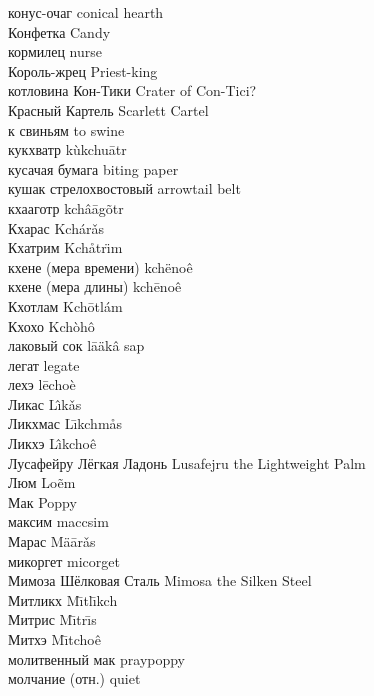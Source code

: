 конус-очаг \hfill conical hearth\\
Конфетка \hfill Candy\\
кормилец \hfill nurse\\
Король-жрец \hfill Priest-king\\
котловина Кон-Тики \hfill Crater of Con-Tici?\\
Красный Картель \hfill Scarlett Cartel\\
к свиньям \hfill to swine\\
кукхватр \hfill k\`{u}kchu\={a}tr\\
кусачая бумага \hfill biting paper\\
кушак стрелохвостовый \hfill arrowtail belt\\
кхааготр \hfill kch\^{a}\={a}g\~{o}tr\\
Кхарас \hfill Kch\'{a}r\v{a}s\\
Кхатрим \hfill Kch\r{a}tr\"{\i}m\\
кхене (мера времени) \hfill kch\"{e}no\^{e}\\
кхене (мера длины) \hfill kch\={e}no\^{e}\\
Кхотлам \hfill Kch\={o}tl\'{a}m\\
Кхохо \hfill Kch\`{o}h\^{o}\\
лаковый сок \hfill l\={a}\"{a}k\^{a} sap\\
легат \hfill legate\\
лехэ \hfill l\={e}cho\`{e}\\
Ликас \hfill L\^{\i}k\v{a}s\\
Ликхмас \hfill L\={\i}kchm\r{a}s\\
Ликхэ \hfill L\^{\i}kcho\^{e}\\
Лусафейру Лёгкая Ладонь \hfill Lusafejru the Lightweight Palm\\
Люм \hfill Lo\~{e}m\\
Мак \hfill Poppy\\
максим \hfill maccsim\\
Марас \hfill M\"{a}\={a}r\v{a}s\\
микоргет \hfill micorget\\
Мимоза Шёлковая Сталь \hfill Mimosa the Silken Steel\\
Митликх \hfill M\={\i}tl\={\i}kch\\
Митрис \hfill M\={\i}tr\={\i}s\\
Митхэ \hfill M\={\i}tcho\^{e}\\
молитвенный мак \hfill praypoppy\\
молчание (отн.) \hfill quiet\\
